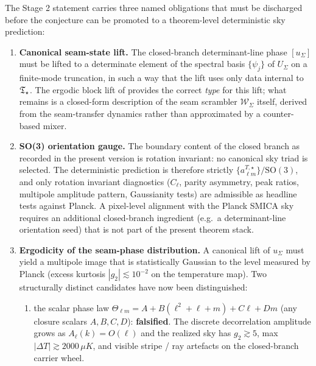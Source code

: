 \begin{remark}
\label{rem:stage2-open-obligations}
The Stage 2 statement  carries three named obligations that
must be discharged before the conjecture can be promoted to a theorem-level deterministic sky
prediction:
\begin{enumerate}[label=(O\arabic*),leftmargin=2.4em,topsep=3pt,itemsep=2pt]
\item \textbf{Canonical seam-state lift.} The closed-branch determinant-line phase $[u_\Sigma]$
must be lifted to a determinate element of the spectral basis $\{\psi_j\}$ of $U_\Sigma$ on a
finite-mode truncation, in such a way that the lift uses only data internal to $\mathfrak T_{\star}$. The
ergodic block lift of  provides the correct \emph{type} for
this lift; what remains is a closed-form description of the seam scrambler $\mathcal W_\Sigma$
itself, derived from the seam-transfer dynamics rather than approximated by a counter-based mixer.
\item \textbf{SO(3) orientation gauge.} The boundary content of the closed branch as recorded in
the present version is rotation invariant: no canonical sky triad is selected. The deterministic
prediction is therefore strictly $\{a_{\ell m}^{T,\star}\}/\mathrm{SO}(3)$, and only rotation
invariant diagnostics
($C_\ell$, parity asymmetry, peak ratios, multipole amplitude pattern, Gaussianity tests) are
admissible as headline tests against Planck. A pixel-level alignment with the Planck SMICA sky
requires an additional closed-branch ingredient (e.g.\ a determinant-line orientation seed) that
is not part of the present theorem stack.
\item \textbf{Ergodicity of the seam-phase distribution.} A canonical lift of $u_\Sigma$ must
yield a multipole image that is statistically Gaussian to the level measured by Planck (excess
kurtosis $|g_2|\lesssim 10^{-2}$ on the temperature map). Two structurally distinct candidates
have now been distinguished:
\begin{enumerate}[label=(\alph*),leftmargin=2em,topsep=2pt,itemsep=1pt]
\item the scalar phase law $\Theta_{\ell m}=A+B(\ell^2+\ell+m)+C\ell+Dm$ (any closure scalars
$A,B,C,D$): \textbf{falsified}. The discrete decorrelation amplitude grows as $A_\ell(k)=O(\ell)$
and the realized sky has $g_2\gtrsim 5$, max $|\Delta T|\gtrsim 2000\,\mu K$, and visible
stripe / ray artefacts on the closed-branch carrier wheel.

\end{enumerate}
\end{enumerate}
\end{remark}
